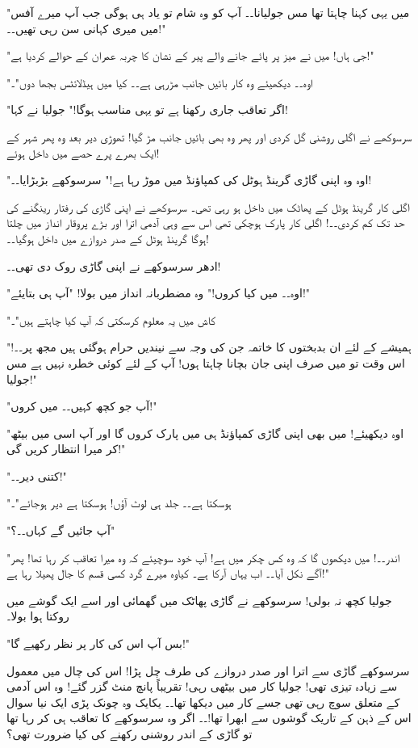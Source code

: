 "میں یہی کہنا چاہتا تھا مس جولیانا۔۔ آپ کو وہ شام تو یاد ہی ہوگی جب آپ میرے آفس میں میری کہانی سن رہی تھیں۔۔!"

"جی ہاں! میں نے میز پر پائے جانے والے پیر کے نشان کا چربہ عمران کے حوالے کردیا ہے!"

"اوہ۔۔ دیکھیئے وہ کار بائیں جانب مڑرہی ہے۔۔ کیا میں ہیڈلائٹس بجھا دوں"۔

"اگر تعاقب جاری رکھنا ہے تو یہی مناسب ہوگا!" جولیا نے کہا!

سرسوکھے نے اگلی روشنی گل کردی اور پھر وہ بھی بائیں جانب مڑ گیا! تھوڑی دیر بعد وہ پھر شہر کے ایک بھرے پرے حصے میں داخل ہوئے!

"اوہ وہ اپنی گاڑی گرینڈ ہوٹل کی کمپاؤنڈ میں موڑ رہا ہے!" سرسوکھے بڑبڑایا۔۔!

اگلی کار گرینڈ ہوٹل کے پھاٹک میں داخل ہو رہی تھی۔ سرسوکھے نے اپنی گاڑی کی رفتار رینگنے کی حد تک کم کردی۔۔! اگلی کار پارک ہوچکی تھی اس سے وہی آدمی اترا اور بڑے پروقار انداز میں چلتا ہوگا گرینڈ ہوٹل کے صدر دروازے میں داخل ہوگیا۔۔!

ادھر سرسوکھے نے اپنی گاڑی روک دی تھی۔۔!

"اوہ۔۔ میں کیا کروں!" وہ مضطربانہ انداز میں بولا! "آپ ہی بتایئے!"

"کاش میں یہ معلوم کرسکتی کہ آپ کیا چاہتے ہیں"۔

"ہمیشے کے لئے ان بدبختوں کا خاتمہ جن کی وجہ سے نیندیں حرام ہوگئی ہیں مجھ پر۔۔! اس وقت تو میں صرف اپنی جان بچانا چاہتا ہوں! آپ کے لئے کوئی خطرہ نہیں ہے مس جولیا!"

"آپ جو کچھ کہیں۔۔ میں کروں!"

"اوہ دیکھیئے! میں بھی اپنی گاڑی کمپاؤنڈ ہی میں پارک کروں گا اور آپ اسی میں بیٹھ کر میرا انتظار کریں گی!"

"کتنی دیر۔۔!"

"ہوسکتا ہے۔۔ جلد ہی لوٹ آؤں! ہوسکتا ہے دیر ہوجائے"۔

"آپ جائیں گے کہاں۔۔؟"

"اندر۔۔! میں دیکھوں گا کہ وہ کس چکر میں ہے! آپ خود سوچیئے کہ وہ میرا تعاقب کر رہا تھا! پھر آگے نکل آیا۔۔ اب یہاں آرکا ہے۔ کیاوہ میرے گرد کسی قسم کا جال پھیلا رہا ہے!"

جولیا کچھ نہ بولی! سرسوکھے نے گاڑی پھاٹک میں گھمائی اور اسے ایک گوشے میں روکتا ہوا بولا۔

"بس آپ اس کی کار پر نظر رکھیے گا!"

سرسوکھے گاڑی سے اترا اور صدر دروازے کی طرف چل پڑا! اس کی چال میں معمول سے زیادہ تیزی تھی! جولیا کار میں بیٹھی رہی! تقریباً پانچ منٹ گزر گئے! وہ اس آدمی کے متعلق سوچ رہی تھی جسے کار میں دیکھا تھا۔۔ یکایک وہ چونک پڑی ایک نیا سوال اس کے ذہن کے تاریک گوشوں سے ابھرا تھا!۔۔ اگر وہ سرسوکھے کا تعاقب ہی کر رہا تھا تو گاڑی کے اندر روشنی رکھنے کی کیا ضرورت تھی؟

